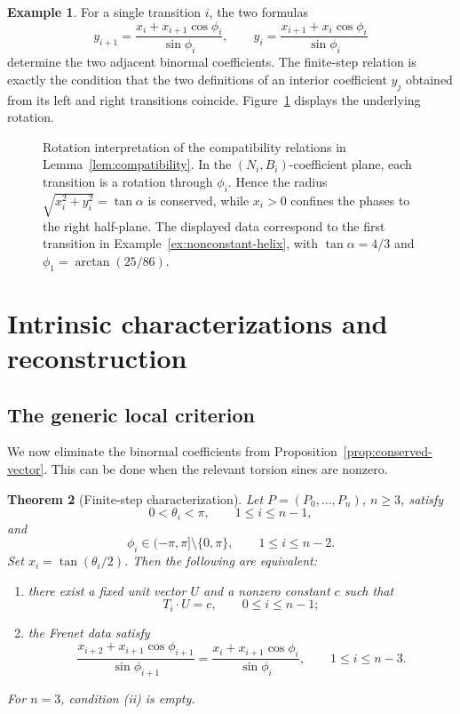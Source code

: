 \documentclass[10pt,a4paper]{amsart}
\newtheorem{theorem}{Theorem}[section]
\theoremstyle{definition}
\newtheorem{example}[theorem]{Example}
\theoremstyle{remark}
\numberwithin{equation}{section}
\begin{document}
\begin{example}\label{ex:compat-rotation}
For a single transition \(i\), the two formulas
\[
y_{i+1}=\frac{x_i+x_{i+1}\cos\phi_i}{\sin\phi_i},
\qquad
y_i=\frac{x_{i+1}+x_i\cos\phi_i}{\sin\phi_i}
\]
determine the two adjacent binormal coefficients.  The finite-step
relation is exactly the condition that the two definitions of an interior
coefficient \(y_j\) obtained from its left and right transitions coincide.  Figure~\ref{fig:compat-rotation} displays the underlying rotation.
\end{example}

\begin{figure}[!ht]
\centering
\resizebox{0.60\textwidth}{!}{}
\caption{Rotation interpretation of the compatibility relations in Lemma~\ref{lem:compatibility}. In the $(N_i,B_i)$-coefficient plane, each transition is a rotation through $\phi_i$. Hence the radius $\sqrt{x_i^2+y_i^2}=\tan\alpha$ is conserved, while $x_i>0$ confines the phases to the right half-plane. The displayed data correspond to the first transition in Example~\ref{ex:nonconstant-helix}, with $\tan\alpha=4/3$ and $\phi_1=\arctan(25/86)$.}
\label{fig:compat-rotation}
\end{figure}

\section{Intrinsic characterizations and reconstruction}

\subsection{The generic local criterion}

We now eliminate the binormal coefficients from Proposition~\ref{prop:conserved-vector}. This can be done when the relevant torsion sines are nonzero.

\begin{theorem}[Finite-step characterization]\label{thm:finite-step}
Let \(P=(P_0,\ldots,P_n)\), \(n\ge3\), satisfy
\[
0<\theta_i<\pi,\qquad 1\le i\le n-1,
\]
and
\[
\phi_i\in(-\pi,\pi]\setminus\{0,\pi\},
\qquad 1\le i\le n-2.
\]
Set \(x_i=\tan(\theta_i/2)\). Then the following are equivalent:
\begin{enumerate}[label=\textup{(\roman*)}]
\item there exist a fixed unit vector \(U\) and a nonzero constant \(c\)
such that
\[
T_i\cdot U=c,\qquad 0\le i\le n-1;
\]
\item the Frenet data satisfy
\[
\boxed{
\frac{x_{i+2}+x_{i+1}\cos\phi_{i+1}}{\sin\phi_{i+1}}
=
\frac{x_i+x_{i+1}\cos\phi_i}{\sin\phi_i}
},
\qquad 1\le i\le n-3.
\]
\end{enumerate}
For \(n=3\), condition \textup{(ii)} is empty.
\end{theorem}
\end{document}
